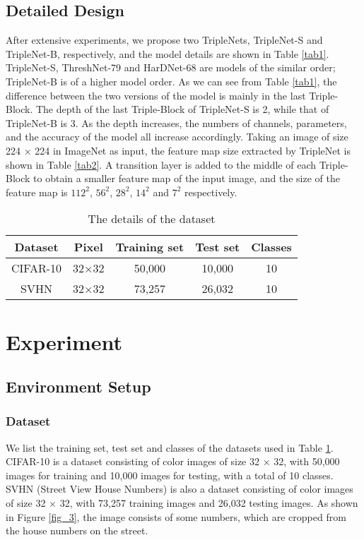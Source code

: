 \documentclass[default,iicol]{sn-jnl}
\theoremstyle{thmstyleone}\newtheorem{theorem}{Theorem}\newtheorem{proposition}[theorem]{Proposition}
\theoremstyle{thmstyletwo}\newtheorem{example}{Example}\newtheorem{remark}{Remark}
\theoremstyle{thmstylethree}\newtheorem{definition}{Definition}
\begin{document}
\subsection{Detailed Design}
After extensive experiments, we propose two TripleNets, TripleNet-S and TripleNet-B, respectively, and the model details are shown in Table \ref{tab1}. TripleNet-S, ThreshNet-79 and HarDNet-68 are models of the similar order; TripleNet-B is of a higher model order. As we can see from Table \ref{tab1}, the difference between the two versions of the model is mainly in the last Triple-Block. The depth of the last Triple-Block of TripleNet-S is 2, while that of TripleNet-B is 3. As the depth increases, the numbers of channels, parameters, and the accuracy of the model all increase accordingly. Taking an image of size 224 × 224 in ImageNet as input, the feature map size extracted by TripleNet is shown in Table \ref{tab2}. A transition layer is added to the middle of each Triple-Block to obtain a smaller feature map of the input image, and the size of the feature map is $112^2$, $56^2$, $28^2$, $14^2$ and $7^2$ respectively.

\begin{table}[]
\centering
\caption{The details of the dataset}
\label{tab3}
\begin{tabular}{|c|c|c|c|c|}
\hline
Dataset & Pixel & Training set & Test set & Classes \\ \hline
CIFAR-10 & 32×32 & 50,000 & 10,000 & 10 \\ \hline
SVHN & 32×32 & 73,257 & 26,032 & 10 \\ \hline
\end{tabular}
\end{table}

\section{Experiment}
\subsection{Environment Setup}
\subsubsection{Dataset}
We list the training set, test set and classes of the datasets used in Table \ref{tab3}. CIFAR-10 \cite{krizhevsky2009learning} is a dataset consisting of color images of size 32 × 32, with 50,000 images for training and 10,000 images for testing, with a total of 10 classes. SVHN (Street View House Numbers) \cite{netzer2011reading} is also a dataset consisting of color images of size 32 × 32, with 73,257 training images and 26,032 testing images. As shown in Figure \ref{fig_3}, the image consists of some numbers, which are cropped from the house numbers on the street.
\end{document}
